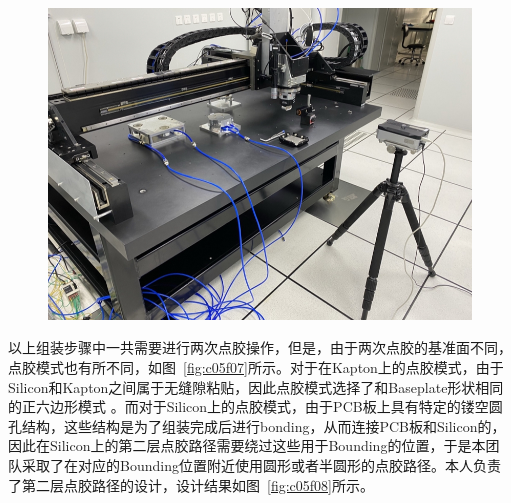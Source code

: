 \begin{figure}[!htbp]
    \centering
    \includegraphics[width=1.0\textwidth]{figures/chapter05/Gantry.jpeg}
    \label{fig:c05f06}
\end{figure}

以上组装步骤中一共需要进行两次点胶操作，但是，由于两次点胶的基准面不同，点胶模式也有所不同，如图~\ref{fig:c05f07}所示。对于在Kapton上的点胶模式，由于Silicon和Kapton之间属于无缝隙粘贴，因此点胶模式选择了和Baseplate形状相同的正六边形模式
。而对于Silicon上的点胶模式，由于PCB板上具有特定的镂空圆孔结构，这些结构是为了组装完成后进行bonding，从而连接PCB板和Silicon的，因此在Silicon上的第二层点胶路径需要绕过这些用于Bounding的位置，于是本团队采取了在对应的Bounding位置附近使用圆形或者半圆形的点胶路径。本人负责了第二层点胶路径的设计，设计结果如图~\ref{fig:c05f08}所示。

